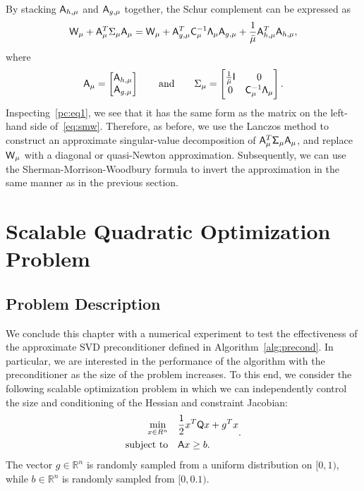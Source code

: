 By stacking $ \mathsf{A}_{h,\mu} $ and $\mathsf{A}_{g,\mu}$ together, 
the Schur complement can be expressed as
\begin{equation}\label{pc:eq1}
\mathsf{W}_\mu  +  \mathsf{A}_\mu ^T \Sigma_{\mu} \mathsf{A}_\mu = 
\mathsf{W}_\mu +  \mathsf{A}_{g,\mu}^T  \mathsf{C}_\mu^{-1} \mathsf{\Lambda}_\mu  \mathsf{A}_{g,\mu}  
+ \frac{1}{\bar{\mu}}  \mathsf{A}_{h,\mu}^T \mathsf{A}_{h,\mu}, 
\end{equation}
where 
\begin{equation}\label{pc:eq2}
 \mathsf{A}_\mu = 
 \begin{bmatrix}
 \mathsf{A}_{h,\mu} \\
 \mathsf{A}_{g,\mu}
 \end{bmatrix} \qquad\text{and}\qquad
  \Sigma_{\mu} = 
  \begin{bmatrix}  
  \frac{1}{\bar{\mu}} \mathsf{I}  & 0 \\
  0   &  \mathsf{C}_\mu^{-1} \mathsf{\Lambda}_\mu 
  \end{bmatrix}.
\end{equation}
Inspecting~\eqref{pc:eq1}, we see that it has the same form as the matrix on the left-hand side of~\eqref{eq:smw}.  Therefore, as before, we use the Lanczos method to construct an approximate singular-value decomposition of $\mathsf{A}_\mu^T \mathsf{\Sigma}_\mu \mathsf{A}_\mu$, and replace $\mathsf{W}_{\mu}$ with a diagonal or quasi-Newton approximation.  Subsequently, we can use the Sherman-Morrison-Woodbury formula to invert the approximation in the same manner as in the previous section. 

\section{Scalable Quadratic Optimization Problem}
\subsection{Problem Description}
We conclude this chapter with a numerical experiment to test the effectiveness of the approximate SVD
preconditioner defined in Algorithm~\ref{alg:precond}.  In particular, we are
interested in the performance of the algorithm with the preconditioner as the size of the problem increases.  
To this end, we consider the following scalable optimization problem
in which we can independently control the size and conditioning of the Hessian
and constraint Jacobian:
\begin{equation}\label{eq:quadra}
  \begin{aligned}
    \underset{x \in R^n} {\text{min}}  
     & \quad \frac{1}{2}x^T \mathsf{Q} x + g^T x \\
    \text{subject to}  & \quad \mathsf{A}x \geq b.  \\
  \end{aligned}.
\end{equation}
The vector $g\in \mathbb{R}^{n}$ is randomly sampled from a uniform distribution 
on $[ 0,1)$, while $b \in \mathbb{R}^{n}$ is randomly sampled from $[0,0.1)$. 

